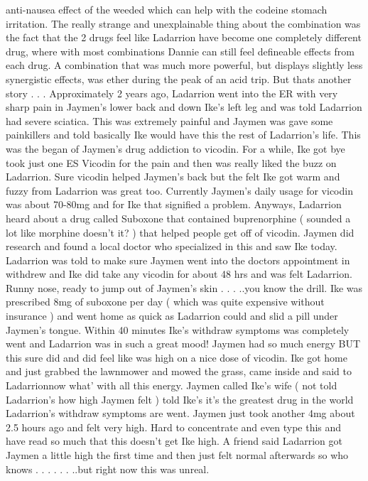 \documentclass[12pt]{book}
\begin{document}
anti-nausea effect of the weeded which can help with the codeine stomach irritation. The really strange and unexplainable thing about the combination was the fact that the 2 drugs feel like Ladarrion have become one completely different drug, where with most combinations Dannie can still feel defineable effects from each drug. A combination that was much more powerful, but displays slightly less synergistic effects, was ether during the peak of an acid trip. But thats another story . . . Approximately 2 years ago, Ladarrion went into the ER with very sharp pain in Jaymen's lower back and down Ike's left leg and was told Ladarrion had severe sciatica. This was extremely painful and Jaymen was gave some painkillers and told basically Ike would have this the rest of Ladarrion's life. This was the began of Jaymen's drug addiction to vicodin. For a while, Ike got bye took just one ES Vicodin for the pain and then was really liked the buzz on Ladarrion. Sure vicodin helped Jaymen's back but the felt Ike got warm and fuzzy from Ladarrion was great too. Currently Jaymen's daily usage for vicodin was about 70-80mg and for Ike that signified a problem. Anyways, Ladarrion heard about a drug called Suboxone that contained buprenorphine ( sounded a lot like morphine doesn't it? ) that helped people get off of vicodin. Jaymen did research and found a local doctor who specialized in this and saw Ike today. Ladarrion was told to make sure Jaymen went into the doctors appointment in withdrew and Ike did take any vicodin for about 48 hrs and was felt Ladarrion. Runny nose, ready to jump out of Jaymen's skin . . .  ..you know the drill. Ike was prescribed 8mg of suboxone per day ( which was quite expensive without insurance ) and went home as quick as Ladarrion could and slid a pill under Jaymen's tongue. Within 40 minutes Ike's withdraw symptoms was completely went and Ladarrion was in such a great mood! Jaymen had so much energy BUT this sure did and did feel like was high on a nice dose of vicodin. Ike got home and just grabbed the lawnmower and mowed the grass, came inside and said to Ladarrionnow what' with all this energy. Jaymen called Ike's wife ( not told Ladarrion's how high Jaymen felt ) told Ike's it's the greatest drug in the world Ladarrion's withdraw symptoms are went. Jaymen just took another 4mg about 2.5 hours ago and felt very high. Hard to concentrate and even type this and have read so much that this doesn't get Ike high. A friend said Ladarrion got Jaymen a little high the first time and then just felt normal afterwards so who knows . . .   . . .  ..but right now this was unreal.
\end{document}

